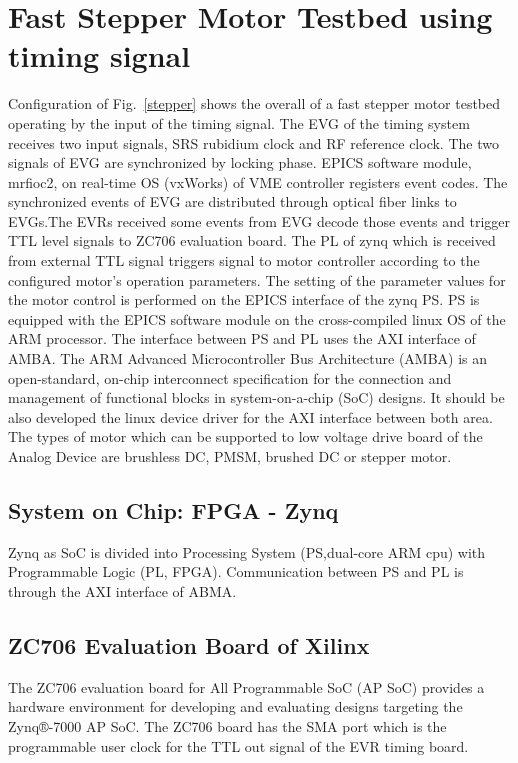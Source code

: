 \documentclass[a4paper,
              ]{jacow}
\begin{document}
\section{Fast Stepper Motor Testbed using timing signal}
Configuration of Fig.~\ref{stepper} shows the overall of a fast stepper motor testbed operating by the input of the timing signal. The EVG of the timing system receives two input signals, SRS rubidium clock and RF reference clock. The two signals of EVG are synchronized by locking phase. EPICS software module, mrfioc2, on real-time OS (vxWorks) of VME controller registers event codes. The synchronized events of EVG are distributed through optical fiber links to EVGs.The EVRs received some events from EVG decode those events and trigger TTL level signals to ZC706 evaluation board. The PL of zynq which is received from external TTL signal triggers signal to motor controller according to the configured motor's operation parameters. The setting of the parameter values for the motor control is performed on the EPICS interface of the zynq PS. PS is equipped with the EPICS software module on the cross-compiled linux OS of the ARM processor. The interface between PS and PL uses the AXI interface of AMBA. The ARM Advanced Microcontroller Bus Architecture (AMBA)\cite{amba-bus} is an open-standard, on-chip interconnect specification for the connection and management of functional blocks in system-on-a-chip (SoC) designs. It should be also developed the linux device driver for the AXI interface between both area. The types of motor which can be supported to low voltage drive board of the Analog Device\cite{analog} are brushless DC, PMSM, brushed DC or stepper motor. 

\subsection{System on Chip: FPGA - Zynq}
Zynq\cite{xilix,zynq} as SoC is divided into Processing System (PS,dual-core ARM cpu) with  Programmable Logic (PL, FPGA). Communication between PS and PL is through the AXI interface of ABMA.

\subsection{ZC706 Evaluation Board of Xilinx}
The ZC706 evaluation board for All Programmable SoC (AP SoC) provides a hardware environment for developing and evaluating designs targeting the Zynq®-7000 AP SoC.\cite{zc706-doc} The ZC706 board has the SMA port which is the programmable user clock for the TTL out signal of the EVR timing board.
\end{document}
